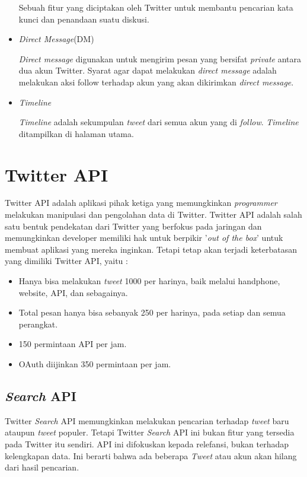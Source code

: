 \begin{itemize}
	Sebuah fitur yang diciptakan oleh Twitter untuk membantu pencarian kata kunci dan penandaan suatu diskusi.
	
	\item \textit{Direct Message}(DM)
	
	\textit{Direct message} digunakan untuk mengirim pesan yang bersifat \textit{private} antara dua akun Twitter. Syarat agar dapat melakukan \textit{direct message} adalah melakukan aksi follow terhadap akun yang akan dikirimkan \textit{direct message}.
	\item \textit{Timeline}
	
	\textit{Timeline} adalah sekumpulan \textit{tweet} dari semua akun yang di \textit{follow}. \textit{Timeline }ditampilkan di halaman utama.
\end{itemize}


\section{Twitter API}
Twitter API adalah aplikasi pihak ketiga yang memungkinkan \textit{programmer} melakukan manipulasi dan pengolahan data di Twitter. Twitter API adalah salah satu bentuk pendekatan dari Twitter yang berfokus pada jaringan dan memungkinkan developer memiliki hak untuk berpikir '\textit{out of the box}' untuk membuat aplikasi yang mereka inginkan. Tetapi tetap akan terjadi keterbatasan yang dimiliki Twitter API, yaitu :
\begin{itemize}
	\item Hanya bisa melakukan \textit{tweet} 1000 per harinya, baik melalui handphone, website, API, dan sebagainya.
	\item Total pesan hanya bisa sebanyak 250 per harinya, pada setiap dan semua perangkat.
	\item 150 permintaan API per jam.
	\item OAuth diijinkan 350 permintaan per jam.
\end{itemize}

\subsection{\textit{Search} API}

Twitter \textit{Search} API memungkinkan melakukan pencarian terhadap \textit{tweet} baru ataupun \textit{tweet} populer. Tetapi Twitter \textit{Search} API ini bukan fitur yang tersedia pada Twitter itu sendiri. API ini difokuskan kepada relefansi, bukan terhadap kelengkapan data. Ini berarti bahwa ada beberapa \textit{Tweet} atau akun akan hilang dari hasil pencarian.

